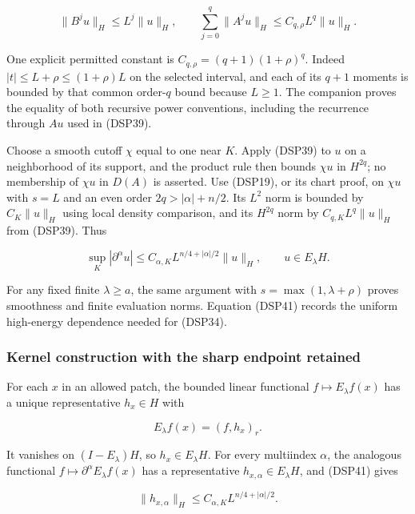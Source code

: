 \documentclass[
  11pt,
]{article}
\makeatletter
\let\ReaderOriginalAnchorStart\hyper@anchorstart
\let\ReaderOriginalAnchorEnd\hyper@anchorend
\let\ReaderPendingAliases\@empty
\def\ReaderArmAliases#1{\gdef\ReaderPendingAliases{#1}}
\def\hyper@anchorstart#1{\ReaderIfNativeAnchorTF{#1}{\ReaderPendingAliases\global\let\ReaderPendingAliases\@empty}{}\ReaderOriginalAnchorStart{#1}}
\makeatother
\begin{document}
\[
 \|B^ju\|_H\leq L^j\|u\|_H,\qquad
 \sum_{j=0}^q\|A^ju\|_H\leq C_{q,\rho}L^q\|u\|_H.
 \tag{DSP40}
\]

One explicit permitted constant is \(C_{q,\rho}=(q+1)(1+\rho)^q\).
Indeed \(|t|\leq L+\rho\leq(1+\rho)L\) on the selected interval, and
each of its \(q+1\) moments is bounded by that common order-\(q\) bound
because \(L\geq1\). The companion proves the equality of both recursive
power conventions, including the recurrence through \(Au\) used in
(DSP39).

Choose a smooth cutoff \(\chi\) equal to one near \(K\). Apply (DSP39)
to \(u\) on a neighborhood of its support, and the product rule then
bounds \(\chi u\) in \(H^{2q}\); no membership of \(\chi u\) in \(D(A)\)
is asserted. Use (DSP19), or its chart proof, on \(\chi u\) with \(s=L\)
and an even order \(2q>|\alpha|+n/2\). Its \(L^2\) norm is bounded by
\(C_K\|u\|_H\) using local density comparison, and its \(H^{2q}\) norm
by \(C_{q,K}L^q\|u\|_H\) from (DSP39). Thus

\[
 \sup_K|\partial^\alpha u|\leq C_{\alpha,K}L^{n/4+|\alpha|/2}\|u\|_H,
 \qquad u\in E_\lambda H.
 \tag{DSP41}
\]

For any fixed finite \(\lambda\geq a\), the same argument with
\(s=\max(1,\lambda+\rho)\) proves smoothness and finite evaluation
norms. Equation (DSP41) records the uniform high-energy dependence
needed for (DSP34).

\ReaderArmAliases{\ReaderOriginalAnchorStart{kernel-construction-with-the-sharp-endpoint-retained}\ReaderOriginalAnchorEnd}
\subsubsection{Kernel construction with the sharp endpoint
retained}\label{kernel-construction-with-the-sharp-endpoint-retained}

For each \(x\) in an allowed patch, the bounded linear functional
\(f\mapsto E_\lambda f(x)\) has a unique representative \(h_x\in H\)
with

\[
 E_\lambda f(x)=(f,h_x)_r.
 \tag{DSP42}
\]

It vanishes on \((I-E_\lambda)H\), so \(h_x\in E_\lambda H\). For every
multiindex \(\alpha\), the analogous functional
\(f\mapsto\partial^\alpha E_\lambda f(x)\) has a representative
\(h_{x,\alpha}\in E_\lambda H\), and (DSP41) gives

\[
 \|h_{x,\alpha}\|_H\leq C_{\alpha,K}L^{n/4+|\alpha|/2}.
 \tag{DSP43}
\]
\end{document}
